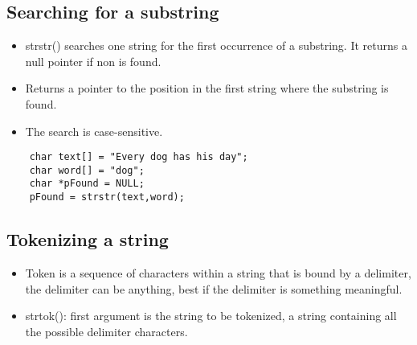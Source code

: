 \subsection{Searching for a substring}
\begin{itemize}
    \item strstr() searches one string for the first occurrence of a substring. It returns a null pointer if non is found. 
    \item Returns a pointer to the position in the first string where the substring is found. 
    \item The search is case-sensitive. 
\end{itemize}
\begin{verbatim}
    char text[] = "Every dog has his day";
    char word[] = "dog"; 
    char *pFound = NULL; 
    pFound = strstr(text,word);
\end{verbatim}

\subsection{Tokenizing a string}
\begin{itemize}
    \item Token is a sequence of characters within a string that is bound by a delimiter, the delimiter can be anything, best if the delimiter is something meaningful.
    \item strtok(): first argument is the string to be tokenized, a string containing all the possible delimiter characters. 
\end{itemize}

